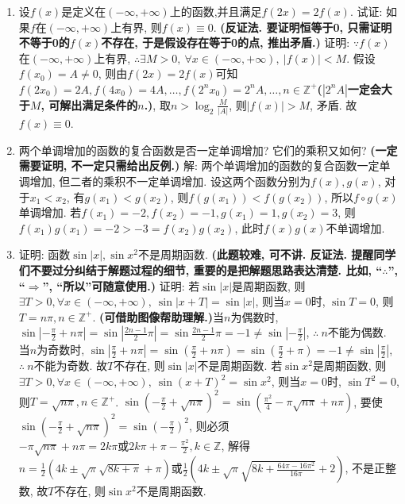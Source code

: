 \documentclass[12pt,UTF8]{ctexart}
\begin{document}
\begin{enumerate}
\begin{figure}[H]
\end{figure}
\item[\bf4.] 设$f(x)$是定义在$(-\infty,+\infty)$上的函数,并且满足$f(2x)=2f(x)$. 试证: 如果$f$在$(-\infty,+\infty)$上有界, 则$f(x)\equiv0$.
\newline
{\bf(反证法. 要证明恒等于0, 只需证明不等于0的$f(x)$不存在, 于是假设存在等于0的点, 推出矛盾.)}
\newline
证明: $\because f(x)$在$(-\infty,+\infty)$上有界, $\therefore\exists M>0,\ \forall x\in(-\infty,+\infty),\ |f(x)|<M$.
\newline
假设$f(x_0)=A\neq0$, 则由$f(2x)=2f(x)$可知$f(2x_0)=2A,f(4x_0)=4A,\dots,f(2^nx_0)=2^nA,\dots,n\in\mathbb Z^+${\bf($|2^nA|$一定会大于$M$, 可解出满足条件的$n$.)}, 取$n>\log_2\frac M{|A|}$, 则$|f(x)|>M$, 矛盾. 故$f(x)\equiv0$.
\item[\bf5.]两个单调增加的函数的复合函数是否一定单调增加? 它们的乘积又如何? 
\newline
{\bf(一定需要证明, 不一定只需给出反例.)}
\newline
解: 两个单调增加的函数的复合函数一定单调增加, 但二者的乘积不一定单调增加. 设这两个函数分别为$f(x),g(x)$, 对于$x_1<x_2$, 有$g(x_1)<g(x_2)$, 则$f(g(x_1))<f(g(x_2))$, 所以$f\circ g(x)$单调增加. 若$f(x_1)=-2,f(x_2)=-1,g(x_1)=1,g(x_2)=3$, 则$f(x_1)g(x_1)=-2>-3=f(x_2)g(x_2)$, 此时$f(x)g(x)$不单调增加.
\item[6.]证明: 函数$\sin|x|,\sin x^2$不是周期函数.
\newline
{\bf(此题较难, 可不讲. 反证法. 提醒同学们不要过分纠结于解题过程的细节, 重要的是把解题思路表达清楚. 比如, “$\therefore$”, “$\Rightarrow$”, “所以”可随意使用.)}
\newline
证明: 若$\sin|x|$是周期函数, 则$\exists T>0,\forall x\in(-\infty,+\infty),\ \sin|x+T|=\sin|x|$, 则当$x=0$时, $\sin T=0$, 则$T=n\pi,n\in\mathbb Z^+$. {\bf(可借助图像帮助理解.)}当$n$为偶数时, $\sin|-\frac\pi2+n\pi|=\sin|\frac{2n-1}2\pi|=\sin\frac{2n-1}2\pi=-1\neq\sin|-\frac\pi2|$, $\therefore\ n$不能为偶数. 当$n$为奇数时, $\sin|\frac\pi2+n\pi|=\sin(\frac\pi2+n\pi)=\sin(\frac\pi2+\pi)=-1\neq\sin|\frac\pi2|$, $\therefore\ n$不能为奇数. 故$T$不存在, 则$\sin|x|$不是周期函数.
\newline
若$\sin x^2$是周期函数, 则$\exists T>0,\forall x\in(-\infty,+\infty),\ \sin(x+T)^2=\sin x^2$, 则当$x=0$时, $\sin T^2=0$, 则$T=\sqrt{n\pi},n\in\mathbb Z^+$. $\sin(-\frac\pi2+\sqrt{n\pi})^2=\sin(\frac{\pi^2}4-\pi\sqrt{n\pi}+n\pi)$, 要使$\sin(-\frac\pi2+\sqrt{n\pi})^2=\sin(-\frac\pi2)^2$, 则必须$-\pi\sqrt{n\pi}+n\pi=2k\pi\text{或}2k\pi+\pi-\frac{\pi^2}2,k\in\mathbb Z$, 解得$n=\frac{1}{2} \left(4 k\pm\sqrt{\pi } \sqrt{8 k+\pi }+\pi \right)\text{或}\frac{1}{2} \left(4 k\pm\sqrt{\pi } \sqrt{8 k+\frac{64 \pi -16 \pi ^2}{16 \pi }}+2\right)$, 不是正整数, 故$T$不存在, 则$\sin x^2$不是周期函数.

\end{enumerate}
\end{document}
